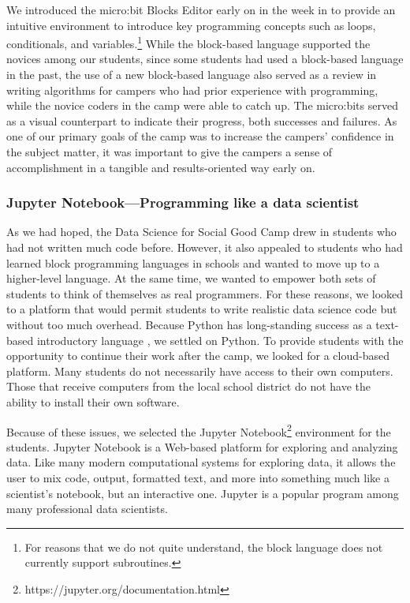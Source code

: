 We introduced the micro:bit Blocks Editor early on in the week in
to provide an intuitive environment to introduce key programming
concepts such as loops, conditionals, and variables.\footnote{For
reasons that we do not quite understand, the block language does
not currently support subroutines.} While the block-based language
supported the novices among our students, since some students had
used a block-based language in the past, the use of a new block-based
language also served as a review in writing algorithms for campers
who had prior experience with programming, while the novice coders
in the camp were able to catch up. The micro:bits served as a visual
counterpart to indicate their progress, both successes and failures.
As one of our primary goals of the camp was to increase the campers'
confidence in the subject matter, it was important to give the
campers a sense of accomplishment in a tangible and results-oriented
way early on.

\subsubsection{Jupyter Notebook---Programming like a data scientist}

As we had hoped, the Data Science for Social Good Camp drew in
students who had not written much code before.  However, it also
appealed to students who had learned block programming languages
in schools and wanted to move up to a higher-level language.  At
the same time, we wanted to empower both sets of students to think
of themselves as real programmers.  For these reasons, we looked
to a platform that would permit students to write realistic data
science code but without too much overhead.  Because Python has
long-standing success as a text-based introductory language
\cite{Guo2014}, we settled on Python.  To provide students with the
opportunity to continue their work after the camp, we looked for a
cloud-based platform.  Many students do not necessarily have access
to their own computers.  Those that receive computers from the local
school district do not have the ability to install their own software.

Because of these issues, we selected the Jupyter
Notebook\footnote{https://jupyter.org/documentation.html} environment
for the students.
Jupyter Notebook is a Web-based platform for exploring and analyzing
data.  Like many modern computational systems for exploring data, it
allows the user to mix code, output, formatted text, and more into
something much like a scientist's notebook, but an interactive one.
Jupyter is a popular program among many professional data scientists.

